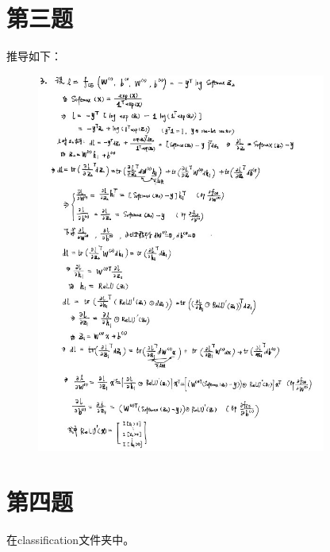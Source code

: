\documentclass[UTF8]{ctexart}
\begin{document}



\newpage
\section{第三题}
推导如下：
\begin{figure}[htbp]
    \centering
    \includegraphics[width=0.85\textwidth]{images/Q3.jpg}
\end{figure}

\section{第四题}
在classification文件夹中。
\end{document}
